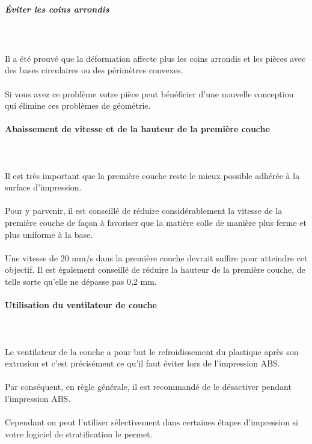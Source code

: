 \documentclass[11pt,a4paper]{article}
\begin{document}
				\subparagraph{Éviter les coins arrondis}\mbox{}\\\\
Il a été prouvé que la déformation affecte plus les coins arrondis et les pièces avec des bases circulaires ou des périmètres convexes.
\\\\
Si vous avez ce problème votre pièce peut bénéficier d’une nouvelle conception qui élimine ces problèmes de géométrie.
			\paragraph{Abaissement de vitesse et de la hauteur de la première couche}\mbox{}\\\\
Il est très important que la première couche reste le mieux possible adhérée à la surface d'impression.
\\\\
Pour y parvenir, il est conseillé de réduire considérablement la vitesse de la première couche de façon à favoriser que la matière colle de manière plus ferme et plus uniforme à la base. 
\\\\
Une vitesse de 20 mm/s dans la première couche devrait suffire pour atteindre cet objectif. Il est également conseillé de réduire la hauteur de la première couche, de telle sorte qu'elle ne dépasse pas 0,2 mm.
			\paragraph{Utilisation du ventilateur de couche}\mbox{}\\\\
Le ventilateur de la couche a pour but le refroidissement du  plastique après son extrusion et c’est précisément ce qu’il faut éviter lors de l’impression ABS. 
\\\\
Par conséquent, en règle générale, il est recommandé de le désactiver pendant l’impression ABS. 
\\\\
Cependant on peut l’utiliser sélectivement dans certaines étapes d’impression si votre logiciel de stratification le permet.
\end{document}

